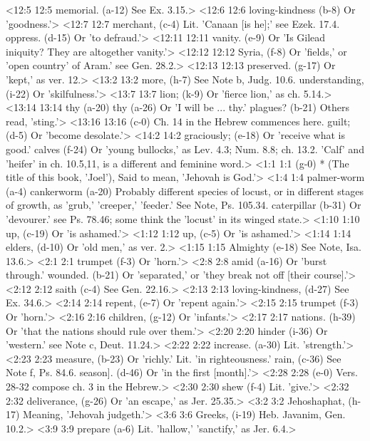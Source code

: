 <12:5 12:5  memorial. (a-12)  See Ex. 3.15.>
<12:6 12:6  loving-kindness (b-8)  Or 'goodness.'>
<12:7 12:7  merchant, (c-4)  Lit. 'Canaan [is he];' see Ezek. 17.4.
  oppress. (d-15)  Or 'to defraud.'>
<12:11 12:11  vanity. (e-9)  Or 'Is Gilead iniquity? They are altogether vanity.'>
<12:12 12:12  Syria, (f-8)  Or 'fields,' or 'open country' of Aram.' see Gen. 28.2.>
<12:13 12:13  preserved. (g-17)  Or 'kept,' as ver. 12.>
<13:2 13:2  more, (h-7)  See Note b, Judg. 10.6.
  understanding, (i-22)  Or 'skilfulness.'>
<13:7 13:7  lion; (k-9)  Or 'fierce lion,' as ch. 5.14.>
<13:14 13:14  thy (a-20)  thy (a-26)
  Or 'I will be ... thy.'
  plagues? (b-21)  Others read, 'sting.'>
<13:16 13:16   (c-0)  Ch. 14 in the Hebrew commences here.
  guilt; (d-5)  Or 'become desolate.'>
<14:2 14:2  graciously; (e-18)  Or 'receive what is good.'
  calves (f-24)  Or 'young bullocks,' as Lev. 4.3; Num. 8.8; ch. 13.2. 'Calf'  and 'heifer' in ch. 10.5,11, is a different and feminine word.>
<1:1 1:1   (g-0)  * (The title of this book, 'Joel'), Said to mean, 'Jehovah is  God.'>
<1:4 1:4  palmer-worm (a-4)  cankerworm (a-20)
  Probably different species of locust, or in different stages  of growth, as 'grub,' 'creeper,' 'feeder.' See Note, Ps. 105.34.
  caterpillar (b-31)  Or 'devourer.' see Ps. 78.46; some think the 'locust' in its  winged state.>
<1:10 1:10  up, (c-19) Or 'is ashamed.'>
<1:12 1:12  up, (c-5)  Or 'is ashamed.'>
<1:14 1:14  elders, (d-10)  Or 'old men,' as ver. 2.>
<1:15 1:15  Almighty (e-18)  See Note, Isa. 13.6.>
<2:1 2:1  trumpet (f-3)  Or 'horn.'>
<2:8 2:8  amid (a-16)  Or 'burst through.'
  wounded. (b-21)  Or 'separated,' or 'they break not off [their course].'>
<2:12 2:12  saith (c-4)  See Gen. 22.16.>
<2:13 2:13  loving-kindness, (d-27)  See Ex. 34.6.>
<2:14 2:14  repent, (e-7)  Or 'repent again.'>
<2:15 2:15  trumpet (f-3)  Or 'horn.'>
<2:16 2:16  children, (g-12)  Or 'infants.'>
<2:17 2:17  nations. (h-39)  Or 'that the nations should rule over them.'>
<2:20 2:20  hinder (i-36)  Or 'western.' see Note c, Deut. 11.24.>
<2:22 2:22  increase. (a-30)  Lit. 'strength.'>
<2:23 2:23  measure, (b-23)  Or 'richly.' Lit. 'in righteousness.'
  rain, (c-36)  See Note f, Ps. 84.6.
  season]. (d-46)  Or 'in the first [month].'>
<2:28 2:28   (e-0)  Vers. 28-32 compose ch. 3 in the Hebrew.>
<2:30 2:30  shew (f-4)  Lit. 'give.'>
<2:32 2:32  deliverance, (g-26)  Or 'an escape,' as Jer. 25.35.>
<3:2 3:2  Jehoshaphat, (h-17)  Meaning, 'Jehovah judgeth.'>
<3:6 3:6  Greeks, (i-19)  Heb. Javanim, Gen. 10.2.>
<3:9 3:9  prepare (a-6)  Lit. 'hallow,' 'sanctify,' as Jer. 6.4.>
